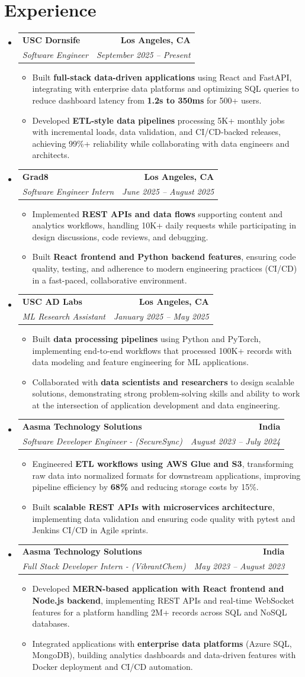 \documentclass[letterpaper,10pt]{article}
\makeatletter
\newcommand{\resumeItem}[1]{\item\small{{#1 \vspace{-2pt}}}}
\newcommand{\resumeSubheading}[4]{\vspace{-1pt}\item\begin{tabular*}{1.0\textwidth}[t]{l@{\extracolsep{\fill}}r}\textbf{#1} & \textbf{\small #2} \\\textit{\small#3} & \textit{\small #4} \\\end{tabular*}\vspace{-2pt}}
\newcommand{\resumeSubHeadingListStart}{\begin{itemize}[leftmargin=0.0in, label={}]}
\newcommand{\resumeSubHeadingListEnd}{\end{itemize}}
\newcommand{\resumeItemListStart}{\begin{itemize}[leftmargin=0.15in,label=\textbullet,itemsep=2pt,topsep=0pt,parsep=0pt,partopsep=0pt]}
\newcommand{\resumeItemListEnd}{\end{itemize}\vspace{-4pt}}
\makeatother
\begin{document}
\section{Experience}
\resumeSubHeadingListStart
\resumeSubheading{USC Dornsife}{Los Angeles, CA}{Software Engineer}{September 2025 -- Present}
\resumeItemListStart
\resumeItem{Built \textbf{full-stack data-driven applications} using React and FastAPI, integrating with enterprise data platforms and optimizing SQL queries to reduce dashboard latency from \textbf{1.2s to 350ms} for 500+ users.}
\resumeItem{Developed \textbf{ETL-style data pipelines} processing 5K+ monthly jobs with incremental loads, data validation, and CI/CD-backed releases, achieving 99\%+ reliability while collaborating with data engineers and architects.}
\resumeItemListEnd
\resumeSubheading{Grad8}{Los Angeles, CA}{Software Engineer Intern}{June 2025 -- August 2025}
\resumeItemListStart
\resumeItem{Implemented \textbf{REST APIs and data flows} supporting content and analytics workflows, handling 10K+ daily requests while participating in design discussions, code reviews, and debugging.}
\resumeItem{Built \textbf{React frontend and Python backend features}, ensuring code quality, testing, and adherence to modern engineering practices (CI/CD) in a fast-paced, collaborative environment.}
\resumeItemListEnd
\resumeSubheading{USC AD Labs}{Los Angeles, CA}{ML Research Assistant}{January 2025 -- May 2025}
\resumeItemListStart
\resumeItem{Built \textbf{data processing pipelines} using Python and PyTorch, implementing end-to-end workflows that processed 100K+ records with data modeling and feature engineering for ML applications.}
\resumeItem{Collaborated with \textbf{data scientists and researchers} to design scalable solutions, demonstrating strong problem-solving skills and ability to work at the intersection of application development and data engineering.}
\resumeItemListEnd
\resumeSubheading{Aasma Technology Solutions}{India}{Software Developer Engineer - (SecureSync)}{August 2023 -- July 2024}
\resumeItemListStart
\resumeItem{Engineered \textbf{ETL workflows using AWS Glue and S3}, transforming raw data into normalized formats for downstream applications, improving pipeline efficiency by \textbf{68\%} and reducing storage costs by 15\%.}
\resumeItem{Built \textbf{scalable REST APIs with microservices architecture}, implementing data validation and ensuring code quality with pytest and Jenkins CI/CD in Agile sprints.}
\resumeItemListEnd
\resumeSubheading{Aasma Technology Solutions}{India}{Full Stack Developer Intern - (VibrantChem)}{May 2023 -- August 2023}
\resumeItemListStart
\resumeItem{Developed \textbf{MERN-based application with React frontend and Node.js backend}, implementing REST APIs and real-time WebSocket features for a platform handling 2M+ records across SQL and NoSQL databases.}
\resumeItem{Integrated applications with \textbf{enterprise data platforms} (Azure SQL, MongoDB), building analytics dashboards and data-driven features with Docker deployment and CI/CD automation.}
\resumeItemListEnd
\resumeSubHeadingListEnd
\vspace{-14pt}
\end{document}
